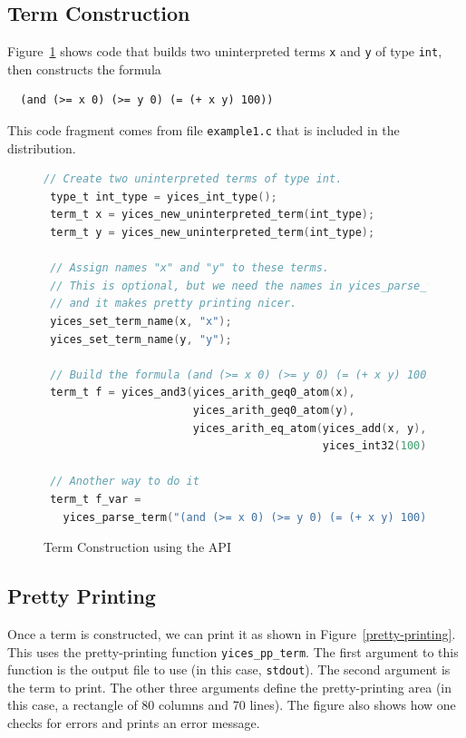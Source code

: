 \documentclass[11pt,twoside,fleqn,openright,titlepage]{cslreport}
\begin{document}
\subsection*{Term Construction}

Figure~\ref{term-construction} shows code that builds two
uninterpreted terms \texttt{x} and \texttt{y} of type \texttt{int},
then constructs the formula
\begin{small}
\begin{verbatim}
  (and (>= x 0) (>= y 0) (= (+ x y) 100))
\end{verbatim}
\end{small}
This code fragment comes from file \texttt{example1.c} that is
included in the distribution.


\begin{figure}
\begin{footnotesize}
\begin{lstlisting}[language=C,morekeywords={type_t,term_t},stringstyle=\color{red},commentstyle=\color{olive}]
 // Create two uninterpreted terms of type int.
 type_t int_type = yices_int_type();
 term_t x = yices_new_uninterpreted_term(int_type);
 term_t y = yices_new_uninterpreted_term(int_type);

 // Assign names "x" and "y" to these terms.
 // This is optional, but we need the names in yices_parse_term
 // and it makes pretty printing nicer.
 yices_set_term_name(x, "x");
 yices_set_term_name(y, "y");

 // Build the formula (and (>= x 0) (>= y 0) (= (+ x y) 100))
 term_t f = yices_and3(yices_arith_geq0_atom(x),
                       yices_arith_geq0_atom(y),
                       yices_arith_eq_atom(yices_add(x, y),
                                           yices_int32(100)));

 // Another way to do it
 term_t f_var =
   yices_parse_term("(and (>= x 0) (>= y 0) (= (+ x y) 100))");
\end{lstlisting}
\end{footnotesize}
\caption{Term Construction using the API}
\label{term-construction}
\end{figure}

\subsection*{Pretty Printing}

Once a term is constructed, we can print it as shown in
Figure~\ref{pretty-printing}.  This uses the pretty-printing function
\texttt{yices\_pp\_term}. The first argument to this function is the
output file to use (in this case, \texttt{stdout}). The second
argument is the term to print. The other three arguments define the
pretty-printing area (in this case, a rectangle of 80 columns and 70
lines). The figure also shows how one checks for errors and prints
an error message.
\end{document}
